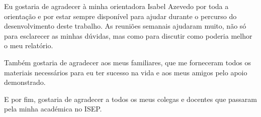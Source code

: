 
\begin{acknowledgements}

Eu gostaria de agradecer à minha orientadora Isabel Azevedo por toda a orientação e por estar sempre disponível para ajudar durante o percurso do desenvolvimento deste trabalho. As reuniões semanais ajudaram muito, não só para esclarecer as minhas dúvidas, mas como para discutir como poderia melhor o meu relatório.

Também gostaria de agradecer aos meus familiares, que me forneceram todos os materiais necessários para eu ter sucesso na vida e aos meus amigos pelo apoio demonstrado.

E por fim, gostaria de agradecer a todos os meus colegas e docentes que passaram pela minha académica no ISEP.

\end{acknowledgements}
